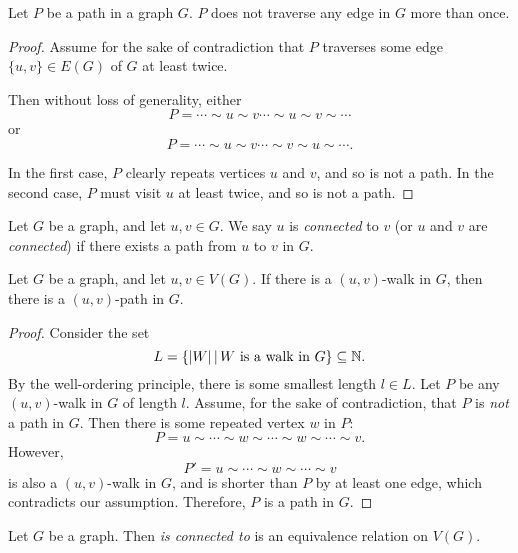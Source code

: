 \begin{prop}
    Let $P$ be a path in a graph $G$. $P$ does not traverse any edge in $G$ more than once.
\end{prop}

\begin{proof}
    Assume for the sake of contradiction that $P$ traverses some edge $\{u, v\} \in E(G)$ of $G$ at least twice.

    Then without loss of generality, either \[P = \cdots \sim u \sim v \cdots \sim u \sim v \sim \cdots\] or \[P = \cdots \sim u \sim v \cdots \sim v \sim u \sim \cdots.\]

    In the first case, $P$ clearly repeats vertices $u$ and $v$, and so is not a path. In the second case, $P$ must visit $u$ at least twice, and so is not a path.
\end{proof}

\begin{defn}
    Let $G$ be a graph, and let $u, v \in G$. We say $u$ is \emph{connected} to $v$ (or $u$ and $v$ are \emph{connected}) if there exists a path from $u$ to $v$ in $G$.
\end{defn}

\begin{lemma}\label{walk-implies-path}
    Let $G$ be a graph, and let $u, v \in V(G)$. If there is a $(u, v)$-walk in $G$, then there is a $(u, v)$-path in $G$.
\end{lemma}

\begin{proof}
    Consider the set \[L = \left\{|W| \,\middle|\, W \textrm{ is a walk in } G\right\} \subseteq \mathbb{N}.\] By the well-ordering principle, there is some smallest length $l \in L$. Let $P$ be any $(u,v)$-walk in $G$ of length $l$. Assume, for the sake of contradiction, that $P$ is \emph{not} a path in $G$. Then there is some repeated vertex $w$ in $P$: \[P = u \sim \cdots \sim w \sim \cdots \sim w \sim \cdots \sim v.\] However, \[P' = u \sim \cdots \sim w \sim \cdots \sim v\] is also a $(u, v)$-walk in $G$, and is shorter than $P$ by at least one edge, which contradicts our assumption. Therefore, $P$ is a path in $G$.
\end{proof}

\begin{prop}
    Let $G$ be a graph. Then \emph{is connected to} is an equivalence relation on $V(G)$.
\end{prop}

